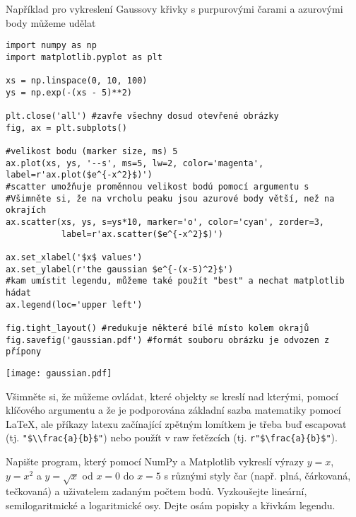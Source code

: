 Například pro vykreslení Gaussovy křivky s purpurovými čarami a azurovými body můžeme udělat
\begin{lstlisting}[caption=Kompletní příklad vykreslování.]
import numpy as np
import matplotlib.pyplot as plt

xs = np.linspace(0, 10, 100)
ys = np.exp(-(xs - 5)**2)

plt.close('all') #zavře všechny dosud otevřené obrázky
fig, ax = plt.subplots()

#velikost bodu (marker size, ms) 5
ax.plot(xs, ys, '--s', ms=5, lw=2, color='magenta', label=r'ax.plot($e^{-x^2}$)')
#scatter umožňuje proměnnou velikost bodú pomocí argumentu s
#Všimněte si, že na vrcholu peaku jsou azurové body větší, než na okrajích
ax.scatter(xs, ys, s=ys*10, marker='o', color='cyan', zorder=3,
           label=r'ax.scatter($e^{-x^2}$)')

ax.set_xlabel('$x$ values')
ax.set_ylabel(r'the gaussian $e^{-(x-5)^2}$')
#kam umístit legendu, můžeme také použít "best" a nechat matplotlib hádat
ax.legend(loc='upper left')

fig.tight_layout() #redukuje některé bílé místo kolem okrajů
fig.savefig('gaussian.pdf') #formát souboru obrázku je odvozen z přípony
\end{lstlisting}
\begin{center}
    \texttt{[image: gaussian.pdf]}
\end{center}
Všimněte si, že můžeme ovládat, které objekty se kreslí nad kterými, pomocí klíčového argumentu  a že je podporována základní sazba matematiky pomocí \LaTeX, ale příkazy latexu začínající zpětným lomítkem je třeba buď escapovat (tj. \verb|"$\\frac{a}{b}$"|) nebo použít v raw řetězcích (tj. \verb|r"$\frac{a}{b}$"|).

\begin{exercise}
    Napište program, který pomocí NumPy a Matplotlib vykreslí výrazy $y=x$, $y=x^2$ a $y=\sqrt{x}$ od $x=0$ do $x=5$ s různými styly čar (např. plná, čárkovaná, tečkovaná) a uživatelem zadaným počtem bodů. Vyzkoušejte lineární, semilogaritmické a logaritmické osy. Dejte osám popisky a křivkám legendu.
\end{exercise}

